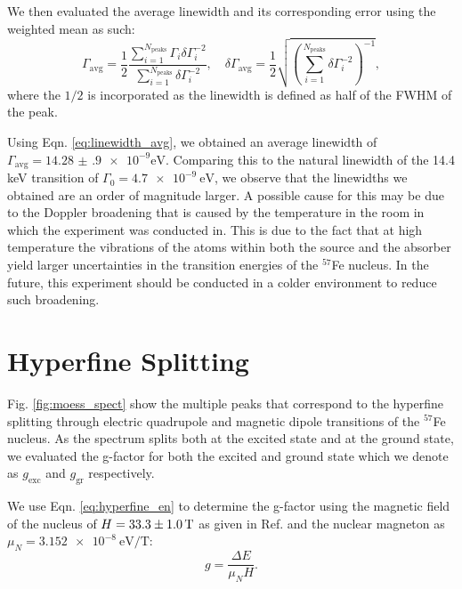 \documentclass[a4paper]{report}
\numberwithin{equation}{section}
\begin{document}
We then evaluated the average linewidth and its corresponding error using the weighted mean as such: 
\begin{equation}
    \Gamma_{\mathrm{avg}} = \frac{1}{2}\frac{\sum_{i=1}^{N_\mathrm{peaks}} \Gamma_i \delta\Gamma_i^{-2}}{\sum_{i=1}^{N_\mathrm{peaks}} \delta\Gamma_i^{-2}} ,
    \quad \delta \Gamma_\mathrm{avg} = \frac{1}{2}\sqrt{\left(\sum_{i=1}^{N_\mathrm{peaks}} \delta\Gamma_i^{-2}\right)^{-1}},
    \label{eq:linewidth_avg}
\end{equation}
where the $1 / 2$ is incorporated as the linewidth is defined as half of the FWHM of the peak. 

Using Eqn. \ref{eq:linewidth_avg}, we obtained an average linewidth of $\Gamma_{\mathrm{avg}} = \num[{scientific-notation = true}]{14.28(90)e-9}\si{\electronvolt}$. 
Comparing this to the natural linewidth of the 14.4 keV transition of $\Gamma_0 = \SI{4.7e-9}{\electronvolt}$, we observe that the linewidths we obtained are an 
order of magnitude larger. A possible cause for this may be due to the Doppler broadening that is caused by the temperature in the room
in which the experiment was conducted in. This is due to the fact that at high temperature the vibrations of the atoms within both the source and 
the absorber yield larger uncertainties in the transition energies of the $^{57}$Fe nucleus. In the future, this experiment should be 
conducted in a colder environment to reduce such broadening.\par 

\section{Hyperfine Splitting}

Fig. \ref{fig:moess_spect} show the multiple peaks that correspond to the hyperfine splitting through electric quadrupole and 
magnetic dipole transitions of the $^{57}$Fe nucleus. As the spectrum splits both at the excited state and at the ground state, we evaluated
the g-factor for both the excited and ground state which we denote as $g_{\mathrm{exc}}$ and $g_{\mathrm{gr}}$ respectively. \par

We use Eqn. \ref{eq:hyperfine_en} to determine the g-factor using the magnetic field of the nucleus of $H = \SI{33.3 \pm 1.0}{\tesla}$ as given in Ref. \cite{k2212016}
and the nuclear magneton as $\mu_N = \SI{3.152e-8}{\electronvolt\per\tesla}$:
\begin{equation}
    g = \frac{\Delta E}{\mu_N H}.
    \label{eq:hyperfine_gfac}
\end{equation}
\end{document}
